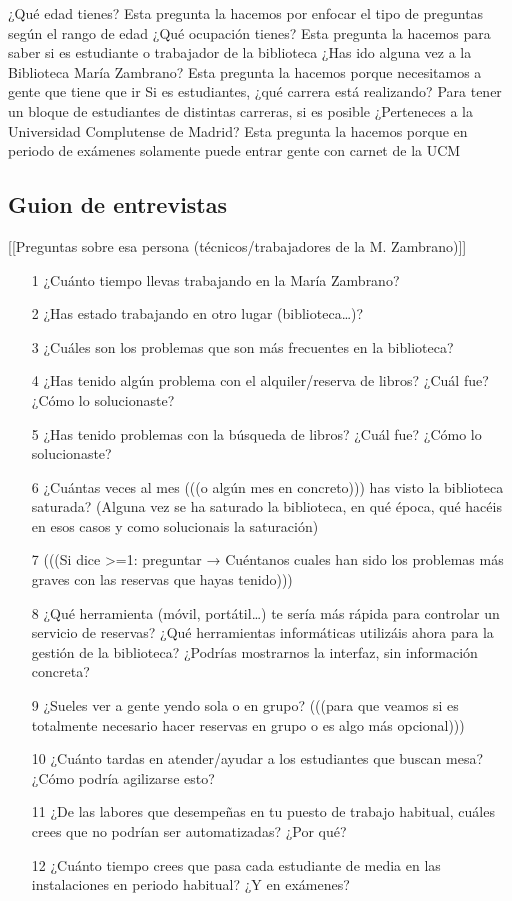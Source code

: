 \documentclass[12pt]{article}
\begin{document}
¿Qué edad tienes?
Esta pregunta la hacemos por enfocar el tipo de preguntas según el rango de edad 
¿Qué ocupación tienes?
Esta pregunta la hacemos para saber si es estudiante o trabajador de la biblioteca 
¿Has ido alguna vez a la Biblioteca María Zambrano?
Esta pregunta la hacemos porque necesitamos a gente que tiene que ir
Si es estudiantes, ¿qué carrera está realizando?
Para tener un bloque de estudiantes de distintas carreras, si es posible
¿Perteneces a la Universidad Complutense de Madrid?
Esta pregunta la hacemos porque en periodo de exámenes solamente puede entrar gente con carnet de la UCM



\subsection{Guion de entrevistas}

[[Preguntas sobre esa persona (técnicos/trabajadores de la M. Zambrano)]] 
\begin{itemize}


\item[1]¿Cuánto tiempo llevas trabajando en la María Zambrano?  
\item[2]¿Has estado trabajando en otro lugar (biblioteca…)? 
\item[3]¿Cuáles son los problemas que son más frecuentes en la biblioteca? 
\item[4]¿Has tenido algún problema con el alquiler/reserva de libros? ¿Cuál fue? ¿Cómo lo solucionaste?
\item[5]¿Has tenido problemas con la búsqueda de libros? ¿Cuál fue? ¿Cómo lo solucionaste?
\item[6]¿Cuántas veces al mes (((o algún mes en concreto))) has visto la biblioteca saturada? (Alguna vez se ha saturado la biblioteca, en qué época, qué hacéis en esos casos y como solucionais la saturación)
\item[7](((Si dice >=1: preguntar → Cuéntanos cuales han sido los problemas más graves con las reservas que hayas tenido)))
\item[8]¿Qué herramienta (móvil, portátil…) te sería más rápida para controlar un servicio de reservas? ¿Qué herramientas informáticas utilizáis ahora para la gestión de la biblioteca? ¿Podrías mostrarnos la interfaz, sin información concreta? 
\item[9]¿Sueles ver a gente yendo sola o en grupo? (((para que veamos si es totalmente necesario hacer reservas en grupo o es algo más opcional))) 
\item[10]¿Cuánto tardas en atender/ayudar a los estudiantes que buscan mesa? ¿Cómo podría agilizarse esto? 
\item[11]¿De las labores que desempeñas en tu puesto de trabajo habitual, cuáles crees que no podrían ser automatizadas? ¿Por qué? 
\item[12]¿Cuánto tiempo crees que pasa cada estudiante de media en las instalaciones en periodo habitual? ¿Y en exámenes? 

\end{itemize}
\end{document}
